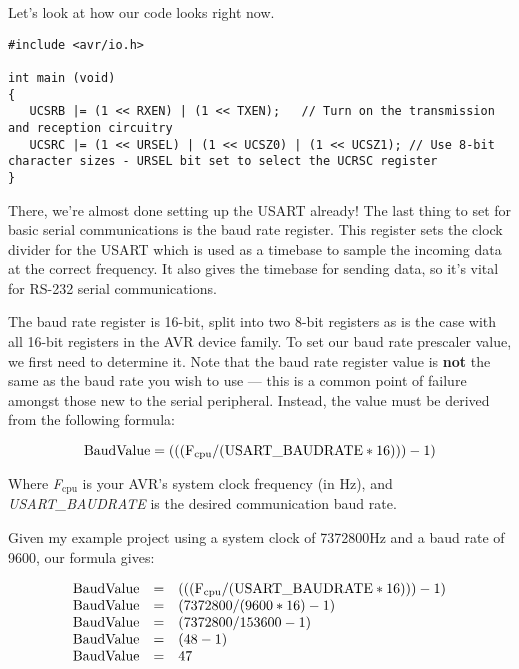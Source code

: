 \documentclass[a4paper,oneside,notitlepage]{book}
\newcommand{\subscript}[1]{\ensuremath{_{\textrm{#1}}}}
\begin{document}
Let's look at how our code looks right now.

\begin{center}
\begin{lstlisting}
#include <avr/io.h>

int main (void)
{
   UCSRB |= (1 << RXEN) | (1 << TXEN);   // Turn on the transmission and reception circuitry
   UCSRC |= (1 << URSEL) | (1 << UCSZ0) | (1 << UCSZ1); // Use 8-bit character sizes - URSEL bit set to select the UCRSC register
}
\end{lstlisting}
\end{center}

There, we're almost done setting up the USART already! The last thing to set for basic serial communications is the baud rate register. This register sets the clock divider for the USART which is used as a timebase to sample the incoming data at the correct frequency. It also gives the timebase for sending data, so it's vital for RS-232 serial communications.

The baud rate register is 16-bit, split into two 8-bit registers as is the case with all 16-bit registers in the AVR device family. To set our baud rate prescaler value, we first need to determine it. Note that the baud rate register value is \textbf{not} the same as the baud rate you wish to use --- this is a common point of failure amongst those new to the serial peripheral. Instead, the value must be derived from the following formula:

\begin{displaymath}
    \text{BaudValue} = (((\text{F\subscript{cpu}} / (\text{USART\_BAUDRATE} * 16))) - 1)
\end{displaymath}

Where \emph{F\subscript{cpu}} is your AVR's system clock frequency (in Hz), and \emph{USART\_BAUDRATE} is the desired communication baud rate.

Given my example project using a system clock of 7372800Hz and a baud rate of 9600, our formula gives:

\begin{displaymath}
\begin{array}{rcl}
    \text{BaudValue} & = & (((\text{F\subscript{cpu}} / (\text{USART\_BAUDRATE} * 16))) - 1) \\
    \text{BaudValue} & = & (7372800 / (9600 * 16) - 1) \\
    \text{BaudValue} & = & (7372800 / 153600 - 1) \\
    \text{BaudValue} & = & (48 - 1) \\
    \text{BaudValue} & = & 47 \\
\end{array}
\end{displaymath}
\end{document}
